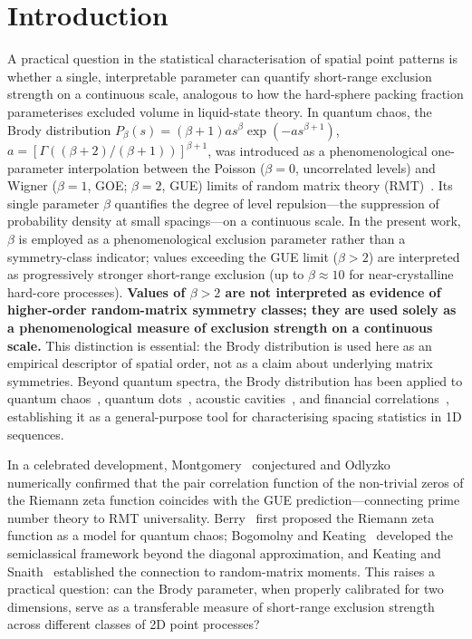 \documentclass[final,3p,times,twocolumn]{elsarticle}
\theoremstyle{definition}
\begin{document}
\section{Introduction}

A practical question in the statistical characterisation of spatial
point patterns is whether a single, interpretable parameter can
quantify short-range exclusion strength on a continuous scale,
analogous to how the hard-sphere packing fraction parameterises
excluded volume in liquid-state theory. In quantum chaos,
the Brody distribution
$P_\beta(s) = (\beta+1) a s^\beta \exp(-a s^{\beta+1})$,
$a = [\Gamma((\beta+2)/(\beta+1))]^{\beta+1}$,
was introduced as a phenomenological one-parameter interpolation
between the Poisson ($\beta=0$, uncorrelated levels) and Wigner
($\beta=1$, GOE; $\beta=2$, GUE) limits of random matrix theory
(RMT)~\cite{BRODY-1981}. Its single parameter
$\beta$ quantifies the degree of level repulsion---the suppression
of probability density at small spacings---on a continuous scale. In the present work, $\beta$ is employed
as a phenomenological exclusion parameter rather than a
symmetry-class indicator; values exceeding the GUE limit
($\beta>2$) are interpreted as progressively stronger
short-range exclusion (up to $\beta\approx 10$ for near-crystalline
hard-core processes). \textbf{Values of $\beta>2$ are not interpreted
as evidence of higher-order random-matrix symmetry classes; they are
used solely as a phenomenological measure of exclusion strength on a
continuous scale.} This distinction is essential: the Brody
distribution is used here as an empirical descriptor of spatial
order, not as a claim about underlying matrix symmetries.
Beyond quantum spectra, the Brody distribution has been applied
to quantum chaos~\cite{STOCKMANN-1999}, quantum dots~\cite{ALHASSID-2000},
acoustic cavities~\cite{WEAVER-1989}, and financial
correlations~\cite{LALOUX-1999}, establishing it as a general-purpose
tool for characterising spacing statistics in 1D sequences.

In a celebrated development, Montgomery~\cite{MONTGOMERY-1973} conjectured
and Odlyzko~\cite{ODLYZKO-1987} numerically confirmed that the pair
correlation function of the non-trivial zeros of the Riemann zeta
function coincides with the GUE prediction---connecting prime number
theory to RMT universality. Berry~\cite{BERRY-1986} first proposed the
Riemann zeta function as a model for quantum chaos; Bogomolny and
Keating~\cite{BOGOMOLNY-1996} developed the semiclassical framework
beyond the diagonal approximation, and Keating and
Snaith~\cite{KEATING-1999} established the connection to random-matrix
moments.
This raises a practical question: can the Brody parameter, when
properly calibrated for two dimensions, serve as a transferable
measure of short-range exclusion strength across different classes
of 2D point processes?
\end{document}
